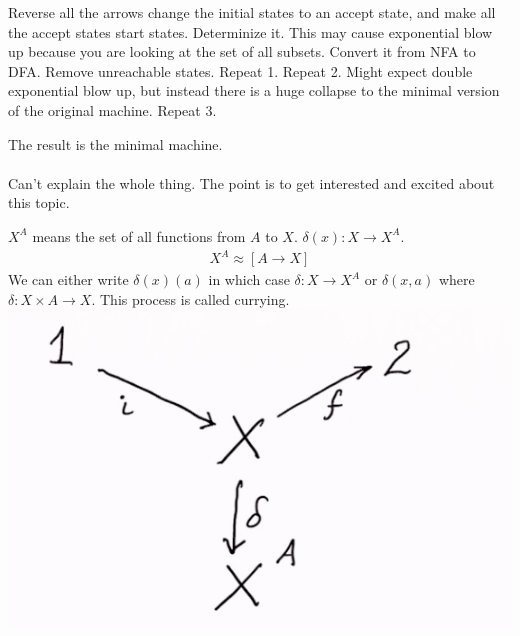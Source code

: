 \documentclass[class=scrartcl, crop=false]{standalone}
\begin{document}
\begin{enumerate}
  \ii
  Reverse all the arrows change the initial states to an accept state, and make all the accept states start states.
  \ii
  Determinize it. This may cause exponential blow up because you are looking at the set of all subsets. Convert it from NFA to DFA.
  \ii
  Remove unreachable states.
  \ii
  Repeat 1.
  \ii
  Repeat 2. Might expect double exponential blow up, but instead there is a huge collapse to the minimal version of the original machine.
  \ii
  Repeat 3.
\end{enumerate} 
The result is the minimal machine.
\\\\
Can't explain the whole thing. The point is to get interested and excited about this topic.

\begin{note}
  $X^A$ means the set of all functions from $A$ to $X$. $\delta(x): X \to X^A$.
  \begin{gather*}
    X^A \approx [A \to X]
  \end{gather*} 
  We can either write $\delta(x)(a)$ in which case $\delta:X \to X^A$ or $\delta(x, a)$ where $\delta: X \times A \to X$. This process is called currying. \\
  \includegraphics[width=\textwidth]{thisisanautomaton}
\end{note} 
\end{document}
